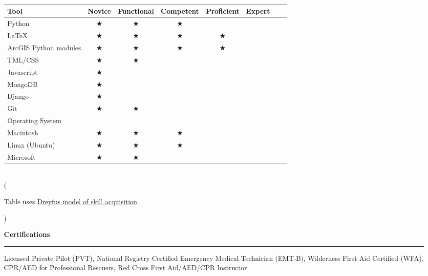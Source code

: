 \documentclass[11pt]{article}
\begin{document}
\begin{table}[h]
\begin{center}
\begin{tabular}{l*{6}{c}r}
\hline
Tool      & Novice & Functional & Competent & Proficient & Expert \\
\hline
Python & $\bigstar$ & $\bigstar$ & $\bigstar$ &  &   \\
\LaTeX            & $\bigstar$ & $\bigstar$ & $\bigstar$ & $\bigstar$ &   \\
ArcGIS Python modules           & $\bigstar$ & $\bigstar$ & $\bigstar$ & $\bigstar$ &   \\
TML/CSS     & $\bigstar$ & $\bigstar$ &  &  &   \\
Javascript     & $\bigstar$ &  &  &  &   \\
MongoDB     & $\bigstar$ &  &  &  &   \\
Django     & $\bigstar$ &  &  &  &   \\
Git     & $\bigstar$ & $\bigstar$ &  &  &    \\ 
\hline
Operating System       \\
\hline
Macintosh & $\bigstar$ & $\bigstar$ & $\bigstar$ &  &  \\
Linux (Ubuntu)            & $\bigstar$ & $\bigstar$ & $\bigstar$ &  &   \\
Microsoft           & $\bigstar$ & $\bigstar$ &  &  &   \\
\end{tabular} \\
(\begin{small}Table uses \href{https://en.wikipedia.org/wiki/Dreyfus\_model\_of\_skill\_acquisition\#The\_original\_five-stage\_model}{Dreyfus model of skill acquisition}\end{small})
\end{center}
\end{table}  



\vspace*{0.25 mm}
\textbf{Certifications}
\smallskip
\hrule  
Licensed Private Pilot (PVT), National Registry Certified Emergency Medical Technician (EMT-B), Wilderness First Aid Certified (WFA), CPR/AED for Professional Rescuers, Red Cross First Aid/AED/CPR Instructor%

\end{document}
